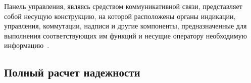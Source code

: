 Панель управления, являясь средством коммуникативной связи,
представляет собой несущую конструкцию, на которой расположены органы индикации,
управления, коммутации, надписи и другие компоненты, предназначенные для
выполнения соответствующих им функций и несущие оператору необходимую
информацию~\cite{Alipherenko2007}.

\subsection{Полный расчет надежности}

\newpage


